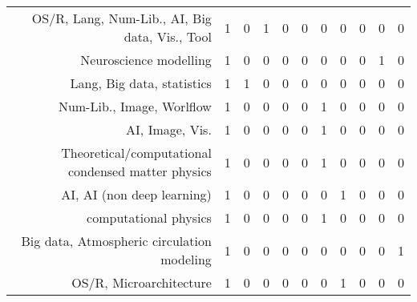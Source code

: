 {\begin{landscape}
\begin{longtable}[htb]{r|c|c|c|c|c|c|c|c|c|c}
{OS/R, Lang, Num-Lib., AI, Big data, Vis., Tool} & 1 & 0 & 1 & 0 & 0 & 0 & 0 & 0 & 0 & 0 \\%
{Neuroscience modelling} & 1 & 0 & 0 & 0 & 0 & 0 & 0 & 0 & 1 & 0 \\%
{Lang, Big data, statistics} & 1 & 1 & 0 & 0 & 0 & 0 & 0 & 0 & 0 & 0 \\%
{Num-Lib., Image, Worlflow} & 1 & 0 & 0 & 0 & 0 & 1 & 0 & 0 & 0 & 0 \\%
{AI, Image, Vis.} & 1 & 0 & 0 & 0 & 0 & 1 & 0 & 0 & 0 & 0 \\%
{Theoretical/computational condensed matter physics} & 1 & 0 & 0 & 0 & 0 & 1 & 0 & 0 & 0 & 0 \\%
{AI, AI (non deep learning)} & 1 & 0 & 0 & 0 & 0 & 0 & 1 & 0 & 0 & 0 \\%
{computational physics} & 1 & 0 & 0 & 0 & 0 & 1 & 0 & 0 & 0 & 0 \\%
{Big data, Atmospheric circulation modeling} & 1 & 0 & 0 & 0 & 0 & 0 & 0 & 0 & 0 & 1 \\%
{OS/R, Microarchitecture} & 1 & 0 & 0 & 0 & 0 & 0 & 1 & 0 & 0 & 0 \\%
\hline%
\end{longtable}%
\end{landscape}}%
\clearpage%
